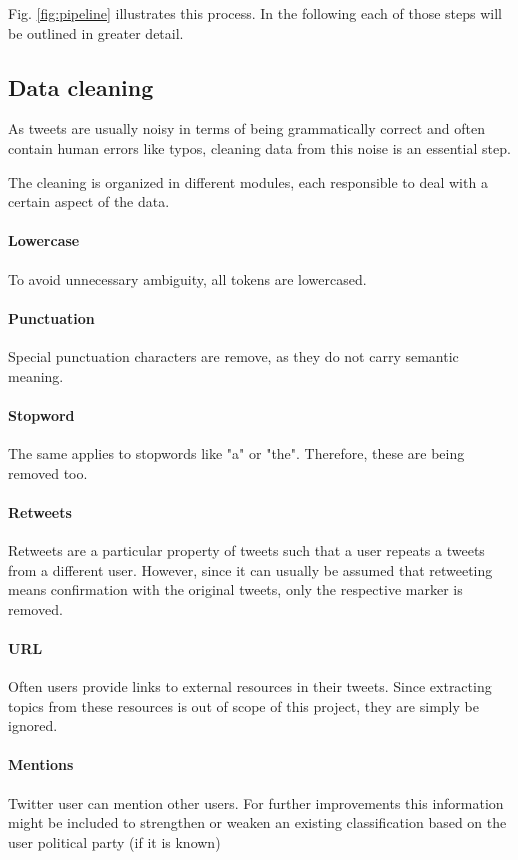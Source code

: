 \documentclass[sigconf, nonacm]{acmart}
\begin{document}
Fig. \ref{fig:pipeline} illustrates this process. In the following each of those steps will be outlined in greater detail.

\subsection{Data cleaning}
\label{subsec:clean}
As tweets are usually noisy in terms of being grammatically correct and often contain human errors like typos, cleaning data from this noise is an essential step.

The cleaning is organized in different modules, each responsible to deal with a certain aspect of the data.

\paragraph{Lowercase} To avoid unnecessary ambiguity, all tokens are lowercased.

\paragraph{Punctuation} Special punctuation characters are remove, as they do not carry semantic meaning.

\paragraph{Stopword} The same applies to stopwords like "a" or "the". Therefore, these are being removed too.

\paragraph{Retweets} Retweets are a particular property of tweets such that a user repeats a tweets from a different user. However, since it can usually be assumed that retweeting means confirmation with the original tweets, only the respective marker is removed.

\paragraph{URL} Often users provide links to external resources in their tweets. Since extracting topics from these resources is out of scope of this project, they are simply be ignored.

\paragraph{Mentions} Twitter user can mention other users. For further improvements this information might be included to strengthen or weaken an existing classification based on the user political party (if it is known)
\end{document}
